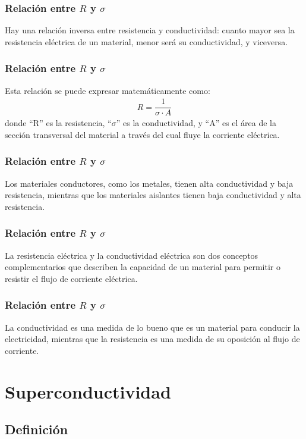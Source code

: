 \documentclass[14pt]{beamer}
\begin{document}
\begin{frame}
\frametitle{Relación entre $R$ y $\sigma$}
Hay una relación inversa entre resistencia y conductividad: \pause cuanto mayor sea la resistencia eléctrica de un material, menor será su conductividad, y viceversa.
\end{frame}
\begin{frame}
\frametitle{Relación entre $R$ y $\sigma$}
Esta relación se puede expresar matemáticamente como:
\pause
\begin{align*}
R =\dfrac{1}{\sigma \cdot A}
\end{align*}
donde \enquote{R} es la resistencia, \enquote{$\sigma$} es la conductividad, y \enquote{A} es el área de la sección transversal del material a través del cual fluye la corriente eléctrica.
\end{frame}
\begin{frame}
\frametitle{Relación entre $R$ y $\sigma$}
Los materiales conductores, como los metales, tienen alta conductividad y baja resistencia, \pause mientras que los materiales aislantes tienen baja conductividad y alta resistencia.
\end{frame}
\begin{frame}
\frametitle{Relación entre $R$ y $\sigma$}
La resistencia eléctrica y la conductividad eléctrica son dos conceptos complementarios que describen la capacidad de un material para permitir o resistir el flujo de corriente eléctrica.
\end{frame}
\begin{frame}
\frametitle{Relación entre $R$ y $\sigma$}
La conductividad es una medida de lo bueno que es un material para conducir la electricidad, \pause mientras que la resistencia es una medida de su oposición al flujo de corriente.
\end{frame}

\section{Superconductividad}
\subsection{Definición}
\end{document}
